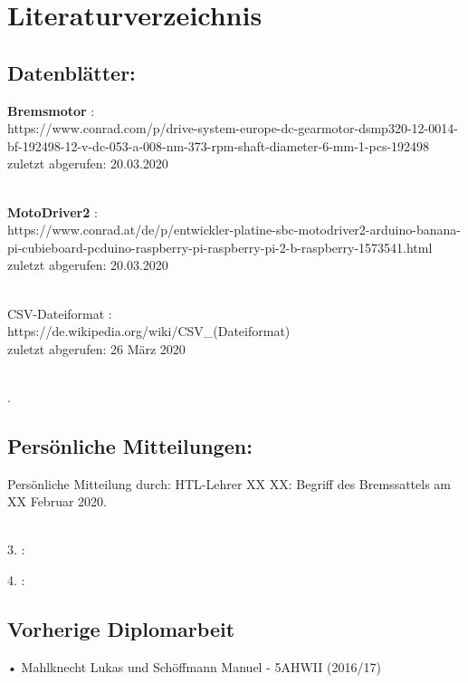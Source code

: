 \documentclass[12pt,a4paper]{article}
\begin{document}
\section{Literaturverzeichnis}
	\begin{description*}
{\footnotesize
\subsection*{Datenblätter:}
	\item[\bf Bremsmotor]:\\
		https://www.conrad.com/p/drive-system-europe-dc-gearmotor-dsmp320-12-0014-bf-192498-12-v-dc-053-a-008-nm-373-rpm-shaft-diameter-6-mm-1-pcs-192498\\
		zuletzt abgerufen: 20.03.2020\\\\
	\item[\bf MotoDriver2]:\\
		https://www.conrad.at/de/p/entwickler-platine-sbc-motodriver2-arduino-banana-pi-cubieboard-pcduino-raspberry-pi-raspberry-pi-2-b-raspberry-1573541.html\\
		zuletzt abgerufen: 20.03.2020\\\\
	\item[CSV-Dateiformat]:\\
		https://de.wikipedia.org/wiki/CSV\_(Dateiformat)\\
		zuletzt abgerufen: 26 März 2020\\\\
	\item[.]
%
\subsection*{Persönliche Mitteilungen:}
		Persönliche Mitteilung durch: HTL-Lehrer XX XX: Begriff des Bremssattels am XX Februar 2020. \\\\
%
	\item[3.]:
	\item[4.]:
	
\subsection*{Vorherige Diplomarbeit}
\item[•]Mahlknecht Lukas und Schöffmann Manuel - 5AHWII (2016/17)\\
}
\end{description*}
%
%
\newpage
\end{document}
